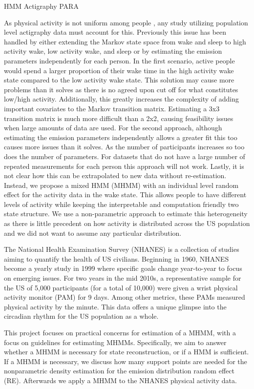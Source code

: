 \documentclass{article}
\begin{document}
HMM Actigraphy PARA

As physical activity is not uniform among people \cite{hootman2003}, any study utilizing population level actigraphy data must account for this. 
Previously this issue has been handled by either extending the Markov state space from wake and sleep to high activity wake, low activity wake, and sleep or by estimating the emission parameters independently for each person. 
In the first scenario, active people would spend a larger proportion of their wake time in the high activity wake state compared to the low activity wake state. 
This solution may cause more problems than it solves as there is no agreed upon cut off for what constitutes low/high activity. 
Additionally, this greatly increases the complexity of adding important covariates to the Markov transition matrix. 
Estimating a 3x3 transition matrix is much more difficult than a 2x2, causing feasibility issues when large amounts of data are used. 
For the second approach, although estimating the emission parameters independently allows a greater fit this too causes more issues than it solves. 
As the number of participants increases so too does the number of parameters. 
For datasets that do not have a large number of repeated measurements for each person this approach will not work. 
Lastly, it is not clear how this can be extrapolated to new data without re-estimation. 
Instead, we propose a mixed HMM (MHMM) \cite{Altman2007} with an individual level random effect for the activity data in the wake state. 
This allows people to have different levels of activity while keeping the interpretable and computation friendly two state structure.
We use a non-parametric approach to estimate this heterogeneity as there is little precedent on how activity is distributed across the US population and we did not want to assume any particular distribution.

The National Health Examination Survey (NHANES) is a collection of studies aiming to quantify the health of US civilians. 
Beginning in 1960, NHANES become a yearly study in 1999 where specific goals change year-to-year to focus on emerging issues. 
For two years in the mid 2010s, a representative sample for the US of 5,000 participants (for a total of 10,000) were given a wrist physical activity monitor (PAM) for 9 days. 
Among other metrics, these PAMs measured physical activity by the minute. 
This data offers a unique glimpse into the circadian rhythm for the US population as a whole.

This project focuses on practical concerns for estimation of a MHMM, with a focus on guidelines for estimating MHMMs. 
Specifically, we aim to answer whether a MHMM is necessary for state reconstruction, or if a HMM is sufficient. 
If a MHMM is necessary, we discuss how many support points are needed for the nonparametric density estimation for the emission distribution random effect (RE). 
Afterwards we apply a MHMM to the NHANES physical activity data.
\end{document}
